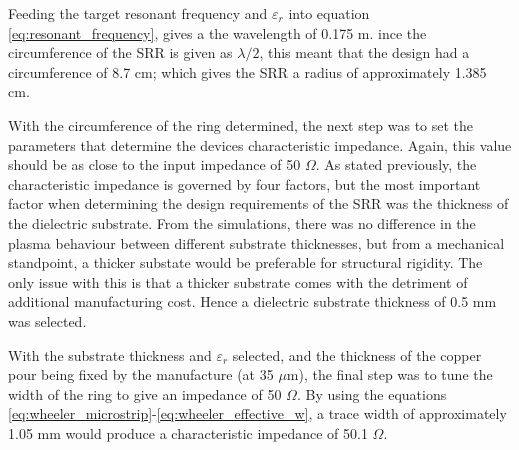 Feeding the target resonant frequency and $\varepsilon_r$ into equation \ref{eq:resonant_frequency}, gives a the wavelength of 0.175 m. ince the circumference of the SRR is given as $\lambda/2$, this meant that the design had a circumference of 8.7 cm; which gives the SRR a radius of approximately 1.385 cm. 

With the circumference of the ring determined, the next step was to set the parameters that determine the devices characteristic impedance. Again, this value should be as close to the input impedance of 50 $\Omega$. As stated previously, the characteristic impedance is governed by four factors, but the most important factor when determining the design requirements of the SRR was the thickness of the dielectric substrate. From the simulations, there was no difference in the plasma behaviour between different substrate thicknesses, but from a mechanical standpoint, a thicker substate would be preferable for structural rigidity. The only issue with this is that a thicker substrate comes with the detriment of additional manufacturing cost. Hence a dielectric substrate thickness of 0.5 mm was selected. 

With the substrate thickness and $\varepsilon_r$ selected, and the thickness of the copper pour being fixed by the manufacture (at 35 $\mu$m), the final step was to tune the width of the ring to give an impedance of 50 $\Omega$. By using the equations \ref{eq:wheeler_microstrip}-\ref{eq:wheeler_effective_w}, a trace width of approximately 1.05 mm would produce a characteristic impedance of 50.1 $\Omega$.

